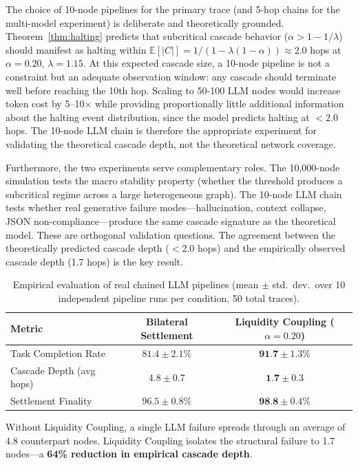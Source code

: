 \documentclass[11pt]{article}
\begin{document}
The choice of 10-node pipelines for the primary trace (and 5-hop chains for the multi-model experiment) is deliberate and theoretically grounded. Theorem~\ref{thm:halting} predicts that subcritical cascade behavior ($\alpha > 1 - 1/\lambda$) should manifest as halting within $\mathbb{E}[|C|] = 1/(1 - \lambda(1-\alpha)) \approx 2.0$ hops at $\alpha=0.20$, $\lambda=1.15$. At this expected cascade size, a 10-node pipeline is not a constraint but an adequate observation window: any cascade should terminate well before reaching the 10th hop. Scaling to 50-100 LLM nodes would increase token cost by 5--10$\times$ while providing proportionally little additional information about the halting event distribution, since the model predicts halting at $< 2.0$ hops. The 10-node LLM chain is therefore the appropriate experiment for validating the theoretical cascade depth, not the theoretical network coverage.

Furthermore, the two experiments serve complementary roles. The 10,000-node simulation tests the macro stability property (whether the threshold produces a subcritical regime across a large heterogeneous graph). The 10-node LLM chain tests whether real generative failure modes---hallucination, context collapse, JSON non-compliance---produce the same cascade signature as the theoretical model. These are orthogonal validation questions. The agreement between the theoretically predicted cascade depth ($< 2.0$ hops) and the empirically observed cascade depth (1.7 hops) is the key result.

\begin{table}[h]
\centering
\begin{tabular}{lcc}
\toprule
Metric & Bilateral Settlement & Liquidity Coupling ($\alpha=0.20$) \\
\midrule
Task Completion Rate & $81.4 \pm 2.1\%$ & $\textbf{91.7} \pm 1.3\%$ \\
Cascade Depth (avg hops) & $4.8 \pm 0.7$ & $\textbf{1.7} \pm 0.3$ \\
Settlement Finality  & $96.5 \pm 0.8\%$ & $\textbf{98.8} \pm 0.4\%$ \\
\bottomrule
\end{tabular}
\caption{Empirical evaluation of real chained LLM pipelines (mean $\pm$ std.~dev.~over 10 independent pipeline runs per condition, 50 total traces).}
\label{tab:empirical_eval}
\end{table}

Without Liquidity Coupling, a single LLM failure spreads through an average of 4.8 counterpart nodes. Liquidity Coupling isolates the structural failure to 1.7 nodes---a \textbf{64\% reduction in empirical cascade depth}.
\end{document}
